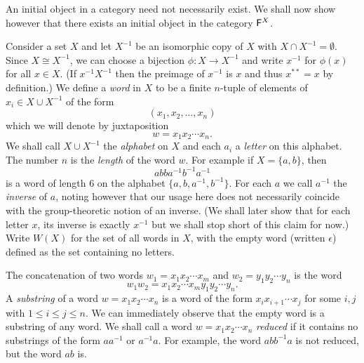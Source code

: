 An initial object in a category need not necessarily exist. We shall now show
however that there exists an initial object in the category \(\mathsf{F}^X\). 

Consider a set \(X\) and let \(X^{-1}\) be an isomorphic copy of \(X\) with \(X
\cap X^{-1} = \emptyset\). Since \(X \cong X^{-1}\), we can choose a bijection
\(\phi : X \to X^{-1}\) and write \(x^{-1}\) for \(\phi(x)\) for all \(x \in
X\). (If \(x^{-1} X^{-1}\) then the preimage of \(x^{-1}\) is \(x\) and thus
\(x^{**} = x\) by definition.) We define a \emph{word} in \(X\) to be a finite
\(n\)-tuple of elements of \(x_i \in X \cup X^{-1}\) of the form
\[
    (x_1, x_2, \ldots, x_n)
\]
which we will denote by juxtaposition
\[
    w = x_1 x_2 \cdots x_n.
\]
We shall call \(X \cup X^{-1}\) the \emph{alphabet} on \(X\) and each \(a_i\) a
\emph{letter} on this alphabet. The number \(n\) is the \emph{length} of the
word \(w\). For example if \(X = \{a, b\}\), then
\[
    abba^{-1}b^{-1}a^{-1}
\]
is a word of length \(6\) on the alphabet \(\{a, b, a^{-1}, b^{-1}\}\). For each
\(a\) we call \(a^{-1}\) the \emph{inverse} of \(a\), noting however that our
usage here does not necessarily coincide with the group-theoretic notion of an
inverse. (We shall later show that for each letter \(x\), its inverse is exactly
\(x^{-1}\) but we shall stop short of this claim for now.) Write \(W(X)\) for
the set of all words in \(X\), with the empty word (written \(\epsilon\))
defined as the set containing no letters.

The concatenation of two words \(w_1 = x_1 x_2 \cdots x_m\) and \(w_2 = y_1 y_2
\cdots y_n\) is the word
\[
    w_1 w_2 = x_1 x_2 \cdots x_m y_1 y_2 \cdots y_n.
\]
A \emph{substring} of a word \(w = x_1 x_2 \cdots x_n\) is a word of the form
\(x_i x_{i + 1} \cdots x_j\) for some \(i, j\) with \(1 \leq i \leq j \leq n\).
We can immediately observe that the empty word is a substring of any word. We
shall call a word \(w = x_1 x_2 \cdots x_n\) \emph{reduced} if it contains no
substrings of the form \(aa^{-1}\) or \(a^{-1}a\). For example, the word
\(abb^{-1}a\) is not reduced, but the word \(ab\) is.


